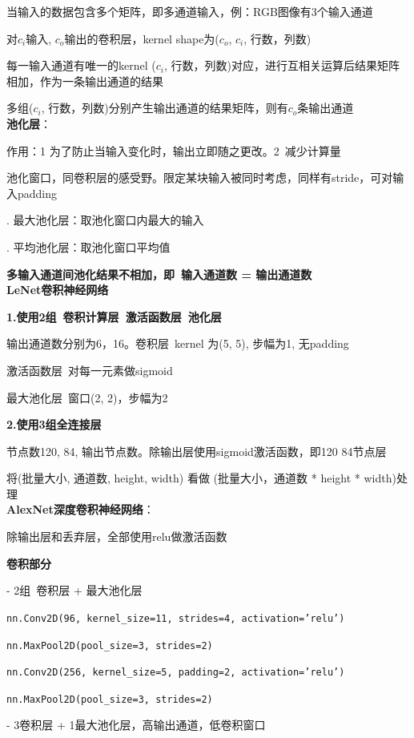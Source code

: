 \documentclass[UTF8]{ctexart}
\begin{document}
  当输入的数据包含多个矩阵，即多通道输入，例：RGB图像有3个输入通道

  对$c_i$输入, $c_o$输出的卷积层，kernel shape为($c_o$, $c_i$, 行数，列数)

  \quad 每一输入通道有唯一的kernel ($c_i$, 行数，列数)对应，进行互相关运算后结果矩阵相加，作为一条输出通道的结果

  \quad 多组($c_i$, 行数，列数)分别产生输出通道的结果矩阵，则有$c_o$条输出通道\\
\textbf{池化层}：
  
  作用：1 为了防止当输入变化时，输出立即随之更改。2\ 减少计算量

  池化窗口，同卷积层的感受野。限定某块输入被同时考虑，同样有stride，可对输入padding

  . 最大池化层：取池化窗口内最大的输入

  . 平均池化层：取池化窗口平均值

  \textbf{多输入通道间池化结果不相加，即\ 输入通道数 = 输出通道数}\\
\textbf{LeNet卷积神经网络}

  \textbf{1.使用2组\ 卷积计算层\ 激活函数层\ 池化层}

  \quad 输出通道数分别为6，16。卷积层\ kernel 为(5, 5), 步幅为1, 无padding

  \quad 激活函数层\ 对每一元素做sigmoid

  \quad 最大池化层\ 窗口(2, 2)，步幅为2

  \textbf{2.使用3组全连接层}

  \quad 节点数120, 84, 输出节点数。除输出层使用sigmoid激活函数，即120 84节点层

  \quad 将(批量大小, 通道数, height, width) 看做 (批量大小，通道数 * height * width)处理\\
\textbf{AlexNet深度卷积神经网络}：

  除输出层和丢弃层，全部使用relu做激活函数

  \textbf{卷积部分}
  
  \quad - 2组\ 卷积层 + 最大池化层
  
  \quad \texttt{nn.Conv2D(96, kernel\_size=11, strides=4, activation='relu')}

  \quad \texttt{nn.MaxPool2D(pool\_size=3, strides=2)}

  \quad \texttt{nn.Conv2D(256, kernel\_size=5, padding=2, activation='relu')}

  \quad \texttt{nn.MaxPool2D(pool\_size=3, strides=2)}
  
  \quad - 3卷积层 + 1最大池化层，高输出通道，低卷积窗口
  
\end{document}
